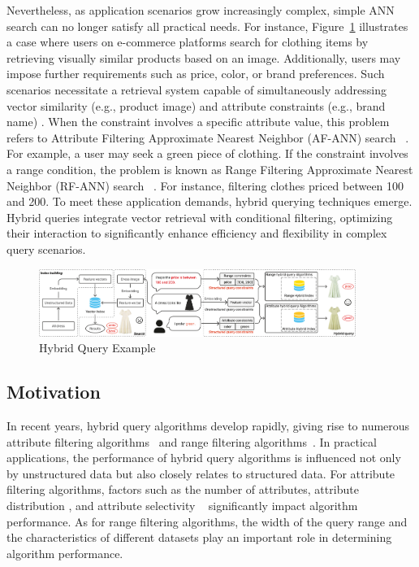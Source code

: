 \documentclass[sigconf, nonacm, pdfa]{acmart}
\begin{document}
	Nevertheless, as application scenarios grow increasingly complex, simple ANN search can no longer satisfy all practical needs. For instance, Figure~\ref{fig:hybrid ANNS} illustrates a case where users on e-commerce platforms search for clothing items by retrieving visually similar products based on an image. Additionally, users may impose further requirements such as price, color, or brand preferences. Such scenarios necessitate a retrieval system capable of simultaneously addressing vector similarity (e.g., product image) and attribute constraints (e.g., brand name) \cite{tian2023approximate}. When the constraint involves a specific attribute value, this problem refers to Attribute Filtering Approximate Nearest Neighbor (AF-ANN) search ~\cite{NHQ,Filtered-diskann}. For example, a user may seek a green piece of clothing. If the constraint involves a range condition, the problem is known as Range Filtering Approximate Nearest Neighbor (RF-ANN) search ~\cite{serf,iRangeGraph}. For instance, filtering clothes priced between 100 and 200. To meet these application demands, hybrid querying techniques \cite{JD-e-commerce, analyticdb} emerge. Hybrid queries integrate vector retrieval with conditional filtering, optimizing their interaction to significantly enhance efficiency and flexibility in complex query scenarios.
	
	\begin{figure}
		\centering
		\setlength{\abovecaptionskip}{0.15cm}
		\setlength{\belowcaptionskip}{-0.10cm}

		\includegraphics[width=0.92\textwidth]{figures/hybridANNS.pdf}
		\caption{Hybrid Query Example}
		
		\label{fig:hybrid ANNS}
	\end{figure}
	\subsection{Motivation}
	In recent years, hybrid query algorithms develop rapidly, giving rise to numerous attribute filtering algorithms~\cite{NHQ,diskann} and range filtering algorithms~\cite{serf,iRangeGraph}. In practical applications, the performance of hybrid query algorithms is influenced not only by unstructured data but also closely relates to structured data. For attribute filtering algorithms, factors such as the number of attributes, attribute distribution \cite{UNG}, and attribute selectivity ~\cite{analyticdb,milvus} significantly impact algorithm performance. As for range filtering algorithms, the width of the query range and the characteristics of different datasets play an important role in determining algorithm performance.
	
\end{document}
